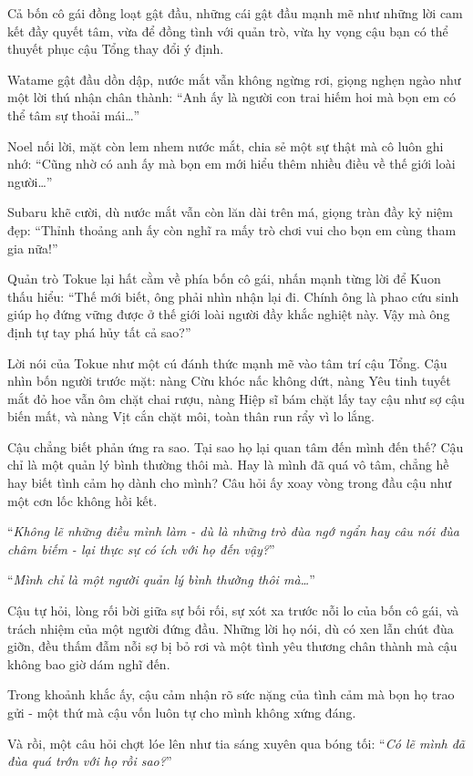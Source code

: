 \documentclass[../main.tex]{subfiles}
\begin{document}
Cả bốn cô gái đồng loạt gật đầu, những cái gật đầu mạnh mẽ như những lời cam kết đầy quyết tâm, vừa để đồng tình với quản trò, vừa hy vọng cậu bạn có thể thuyết phục cậu Tổng thay đổi ý định.

Watame gật đầu dồn dập, nước mắt vẫn không ngừng rơi, giọng nghẹn ngào như một lời thú nhận chân thành: ``Anh ấy là người con trai hiếm hoi mà bọn em có thể tâm sự thoải mái\dots''

Noel nối lời, mặt còn lem nhem nước mắt, chia sẻ một sự thật mà cô luôn ghi nhớ: ``Cũng nhờ có anh ấy mà bọn em mới hiểu thêm nhiều điều về thế giới loài người\dots''

Subaru khẽ cười, dù nước mắt vẫn còn lăn dài trên má, giọng tràn đầy kỷ niệm đẹp: ``Thỉnh thoảng anh ấy còn nghĩ ra mấy trò chơi vui cho bọn em cùng tham gia nữa!''

Quản trò Tokue lại hất cằm về phía bốn cô gái, nhấn mạnh từng lời để Kuon thấu hiểu: ``Thế mới biết, ông phải nhìn nhận lại đi. Chính ông là phao cứu sinh giúp họ đứng vững được ở thế giới loài người đầy khắc nghiệt này. Vậy mà ông định tự tay phá hủy tất cả sao?''

Lời nói của Tokue như một cú đánh thức mạnh mẽ vào tâm trí cậu Tổng. Cậu nhìn bốn người trước mặt: nàng Cừu khóc nấc không dứt, nàng Yêu tinh tuyết mắt đỏ hoe vẫn ôm chặt chai rượu, nàng Hiệp sĩ bám chặt lấy tay cậu như sợ cậu biến mất, và nàng Vịt cắn chặt môi, toàn thân run rẩy vì lo lắng.

Cậu chẳng biết phản ứng ra sao. Tại sao họ lại quan tâm đến mình đến thế? Cậu chỉ là một quản lý bình thường thôi mà. Hay là mình đã quá vô tâm, chẳng hề hay biết tình cảm họ dành cho mình? Câu hỏi ấy xoay vòng trong đầu cậu như một cơn lốc không hồi kết.

``\textit{Không lẽ những điều mình làm - dù là những trò đùa ngớ ngẩn hay câu nói đùa châm biếm - lại thực sự có ích với họ đến vậy?}''

``\textit{Mình chỉ là một người quản lý bình thường thôi mà\dots}''

Cậu tự hỏi, lòng rối bời giữa sự bối rối, sự xót xa trước nỗi lo của bốn cô gái, và trách nhiệm của một người đứng đầu. Những lời họ nói, dù có xen lẫn chút đùa giỡn, đều thấm đẫm nỗi sợ bị bỏ rơi và một tình yêu thương chân thành mà cậu không bao giờ dám nghĩ đến.

Trong khoảnh khắc ấy, cậu cảm nhận rõ sức nặng của tình cảm mà bọn họ trao gửi - một thứ mà cậu vốn luôn tự cho mình không xứng đáng.

Và rồi, một câu hỏi chợt lóe lên như tia sáng xuyên qua bóng tối: ``\textit{Có lẽ mình đã đùa quá trớn với họ rồi sao?}''
\end{document}
